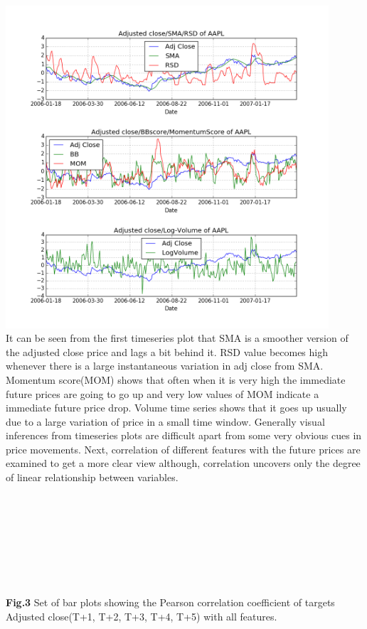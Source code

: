 \documentclass[10pt]{report}
\begin{document}
\includegraphics[width=12cm]{plots/allplots.png}\\
It can be seen from the first timeseries plot that SMA is a smoother version of the adjusted close price and lags a bit behind it. RSD value becomes high whenever there is a large instantaneous variation in adj close from SMA. Momentum score(MOM) shows that often when it is very high the immediate future prices are going to go up and very low values of MOM indicate a immediate future price drop. Volume time series shows that it goes up usually due to a large variation of price in a small time window. Generally visual inferences from timeseries plots are difficult apart from some very obvious cues in price movements. Next, correlation of different features with the future prices are examined to get a more clear view although, correlation uncovers only the degree of linear relationship between variables.\\
\\
\\
\\
\\
\\
\\
\\
\\
\textbf{Fig.3} Set of bar plots showing the Pearson correlation coefficient of targets Adjusted close(T+1, T+2, T+3, T+4, T+5) with all features.\\
\end{document}
